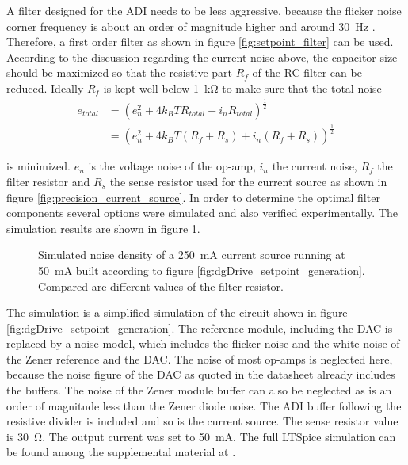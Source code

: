 A filter designed for the ADI  needs to be less aggressive, because the flicker noise corner frequency is about an order of magnitude higher and around \qty{30}{\Hz} \cite{datasheet_AD797}. Therefore, a first order filter as shown in figure \ref{fig:setpoint_filter} can be used. According to the discussion regarding the current noise above, the capacitor size should be maximized so that the resistive part $R_f$ of the RC filter can be reduced. Ideally $R_{f}$ is kept well below \qty{1}{\kilo\ohm} to make sure that the total noise
\begin{align}
    e_{total} &= \left(e_n^2 + 4 k_B T R_{total} + i_n R_{total} \right)^{\frac{1}{2}} \nonumber\\
    &= \left(e_n^2 + 4 k_B T \left(R_f + R_s\right) + i_n  \left(R_f + R_s\right) \right)^{\frac{1}{2}}
\end{align}

is minimized. $e_n$ is the voltage noise of the op-amp, $i_n$ the current noise, $R_f$ the filter resistor and $R_s$ the sense resistor used for the current source as shown in figure \ref{fig:precision_current_source}. In order to determine the optimal filter components several options were simulated and also verified experimentally. The simulation results are shown in figure \ref{fig:dgDrive_filter_resistor_simulation}.
\begin{figure}[ht]
    \centering
    
    \caption{Simulated noise density of a \qty{250}{\mA} current source running at \qty{50}{\mA} built according to figure \ref{fig:dgDrive_setpoint_generation}. Compared are different values of the filter resistor.}
    \label{fig:dgDrive_filter_resistor_simulation}
\end{figure}

The simulation is a simplified simulation of the circuit shown in figure \ref{fig:dgDrive_setpoint_generation}. The reference module, including the DAC is replaced by a noise model, which includes the flicker noise and the white noise of the Zener reference and the DAC. The noise of most op-amps is neglected here, because the noise figure of the DAC as quoted in the datasheet \cite{datasheet_AD5781} already includes the buffers. The noise of the Zener module buffer can also be neglected as is an order of magnitude less than the Zener diode noise. The ADI  buffer following the resistive divider is included and so is the  current source. The sense resistor value is \qty{30}{\ohm}. The output current was set to \qty{50}{\mA}. The full LTSpice simulation can be found among the supplemental material at .


